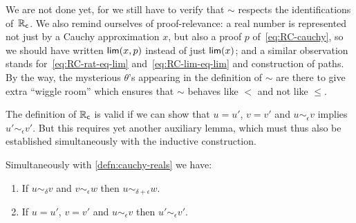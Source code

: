 We are not done yet, for we still have to verify that $\sim$ respects the identifications
of~$\mathbb{R}_\mathsf{c}$. We also remind ourselves of proof-relevance: a real number is represented not
just by a Cauchy approximation $x$, but also a proof $p$ of~\eqref{eq:RC-cauchy}, so we
should have written $\mathsf{lim}(x,p)$ instead of just $\mathsf{lim}(x)$; and a similar observation
stands for~\eqref{eq:RC-rat-eq-lim} and~\eqref{eq:RC-lim-eq-lim} and construction of paths.
By the way, the mysterious $\theta$'s appearing in the definition of $\sim$ are there to
give extra ``wiggle room'' which ensures that $\sim$ behaves like $<$ and not like $\leq$.

The definition of $\mathbb{R}_\mathsf{c}$ is valid if we can show that $u = u'$, $v = v'$ and $u
\sim_\epsilon v$ implies $u' \sim_\epsilon v'$. But this requires yet another auxiliary
lemma, which must thus also be established simultaneously with the inductive construction.

\begin{lem}\label{lem:RC-well-defined}
  Simultaneously with \autoref{defn:cauchy-reals} we have:
  \begin{enumerate}
  \item If $u \sim_\delta v$ and $v \sim_\epsilon w$ then $u \sim_{\delta + \epsilon} w$.
  \item If $u = u'$, $v = v'$ and $u \sim_\epsilon v$ then $u' \sim_\epsilon v'$.
  \end{enumerate}
\end{lem}

